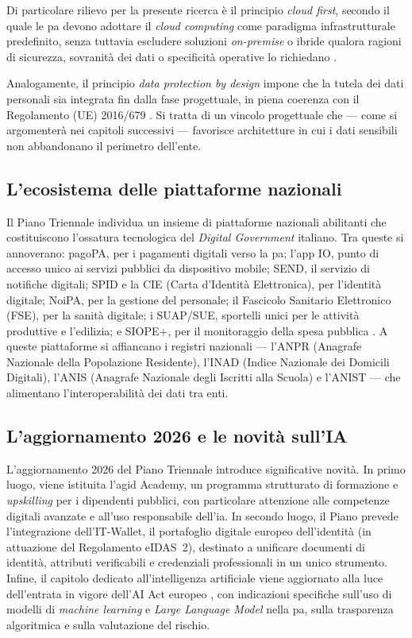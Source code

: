 Di particolare rilievo per la presente ricerca è il principio \textit{cloud first}, secondo il quale le \gls{pa} devono adottare il \textit{cloud computing} come paradigma infrastrutturale predefinito, senza tuttavia escludere soluzioni \textit{on-premise} o ibride qualora ragioni di sicurezza, sovranità dei dati o specificità operative lo richiedano \parencite{AgIDPianoTriennale2024}.

Analogamente, il principio \textit{data protection by design} impone che la tutela dei dati personali sia integrata fin dalla fase progettuale, in piena coerenza con il Regolamento (UE) 2016/679 \parencite{GDPR}. Si tratta di un vincolo progettuale che --- come si argomenterà nei capitoli successivi --- favorisce architetture in cui i dati sensibili non abbandonano il perimetro dell'ente.

\subsection{L'ecosistema delle piattaforme nazionali}

Il Piano Triennale individua un insieme di piattaforme nazionali abilitanti che costituiscono l'ossatura tecnologica del \textit{Digital Government} italiano. Tra queste si annoverano: pagoPA, per i pagamenti digitali verso la \gls{pa}; l'app IO, punto di accesso unico ai servizi pubblici da dispositivo mobile; SEND, il servizio di notifiche digitali; SPID e la CIE (Carta d'Identità Elettronica), per l'identità digitale; NoiPA, per la gestione del personale; il Fascicolo Sanitario Elettronico (FSE), per la sanità digitale; i SUAP/SUE, sportelli unici per le attività produttive e l'edilizia; e SIOPE+, per il monitoraggio della spesa pubblica \parencite{AgIDPianoTriennale2024}. A queste piattaforme si affiancano i registri nazionali --- l'ANPR (Anagrafe Nazionale della Popolazione Residente), l'INAD (Indice Nazionale dei Domicili Digitali), l'ANIS (Anagrafe Nazionale degli Iscritti alla Scuola) e l'ANIST --- che alimentano l'interoperabilità dei dati tra enti.

\subsection{L'aggiornamento 2026 e le novità sull'IA}

L'aggiornamento 2026 del Piano Triennale \parencite{PianoTriennaleAgg2026} introduce significative novità. In primo luogo, viene istituita l'\gls{agid} Academy, un programma strutturato di formazione e \textit{upskilling} per i dipendenti pubblici, con particolare attenzione alle competenze digitali avanzate e all'uso responsabile dell'\gls{ia}. In secondo luogo, il Piano prevede l'integrazione dell'IT-Wallet, il portafoglio digitale europeo dell'identità (in attuazione del Regolamento eIDAS~2), destinato a unificare documenti di identità, attributi verificabili e credenziali professionali in un unico strumento. Infine, il capitolo dedicato all'intelligenza artificiale viene aggiornato alla luce dell'entrata in vigore dell'AI Act europeo \parencite{AIAct2024}, con indicazioni specifiche sull'uso di modelli di \textit{machine learning} e \textit{Large Language Model} nella \gls{pa}, sulla trasparenza algoritmica e sulla valutazione del rischio.

